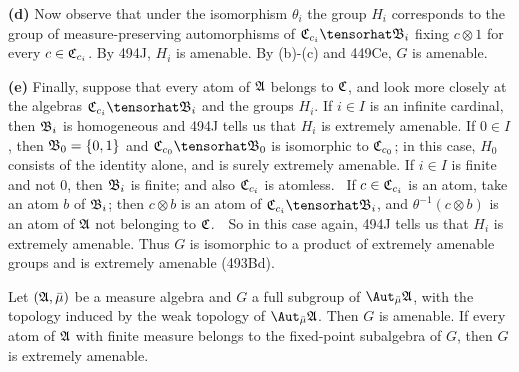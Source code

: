 {\medskip

{\bf (d)} Now observe that under the isomorphism $\theta_i$ the
group $H_i$ corresponds to the group of measure-preserving automorphisms of
$\frak C_{c_i}\tensorhat\frak B_i$ fixing $c\otimes 1$ for every
$c\in\frak C_{c_i}$.   By 494J, $H_i$ is amenable.
By (b)-(c) and 449Ce, $G$ is amenable.

\medskip

{\bf (e)} Finally, suppose that every atom of $\frak A$ belongs to
$\frak C$, and look more closely at the algebras
$\frak C_{c_i}\tensorhat\frak B_i$ and the groups $H_i$.   If
$i\in I$ is an infinite cardinal, then $\frak B_i$ is homogeneous and 494J
tells us that $H_i$ is
extremely amenable.   If $0\in I$, then $\frak B_0=\{0,1\}$ and
$\frak C_{c_0}\tensorhat\frak B_0$ is isomorphic to $\frak C_{c_0}$;  in
this case, $H_0$ consists of the identity alone, and is surely extremely
amenable.   If $i\in I$ is finite and not $0$, then $\frak B_i$ is finite;
and also $\frak C_{c_i}$ is atomless.   \Prf\Quer\ If $c\in\frak C_{c_i}$
is an atom, take an atom $b$ of $\frak B_i$;  then $c\otimes b$ is an atom
of $\frak C_{c_i}\tensorhat\frak B_i$, and $\theta^{-1}(c\otimes b)$ is an
atom of $\frak A$ not belonging to $\frak C$.\ \Bang\QeD\  So in this case
again, 494J tells us that $H_i$ is extremely amenable.   Thus $G$ is
isomorphic to a product of extremely amenable groups and is extremely
amenable (493Bd).
}%

 Let $(\frak A,\bar\mu)$ be a measure algebra and $G$
a full subgroup of $\AmuA$, with the topology induced by the weak
topology of $\AmuA$.   Then $G$ is amenable.
If every atom of $\frak A$ with finite measure
belongs to the fixed-point subalgebra of $G$, then $G$ is
extremely amenable.


